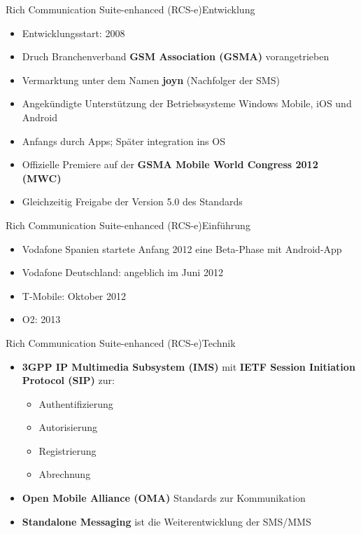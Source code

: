 \documentclass{beamer}
\begin{document}
\begin{frame}{Rich Communication Suite-enhanced (RCS-e)}{Entwicklung}
	\begin{itemize}
		\item Entwicklungsstart: 2008
		\item Druch Branchenverband \textbf{GSM Association (GSMA)} vorangetrieben
		\item Vermarktung unter dem Namen \textbf{joyn} (\glqq{}Nachfolger der SMS\grqq{})
		\item Angekündigte Unterstützung der Betriebssysteme Windows Mobile, iOS und Android
		\item Anfangs durch Apps; Später integration ins OS
		\item Offizielle Premiere auf der \textbf{GSMA Mobile World Congress 2012 (MWC)}
		\item Gleichzeitig Freigabe der Version 5.0 des Standards
	\end{itemize}
\end{frame}

\begin{frame}{Rich Communication Suite-enhanced (RCS-e)}{Einführung}
\begin{itemize}
	\item Vodafone Spanien startete Anfang 2012 eine Beta-Phase mit Android-App
	\item Vodafone Deutschland: \glqq{}angeblich\grqq{} im Juni 2012
	\item T-Mobile: Oktober 2012
	\item O2: 2013
\end{itemize}
\end{frame}


\begin{frame}{Rich Communication Suite-enhanced (RCS-e)}{Technik\cite{rcs:spec}}
	\begin{itemize}
		\item \textbf{3GPP IP Multimedia Subsystem (IMS)} mit \textbf{IETF Session Initiation Protocol (SIP)} zur:
			\begin{itemize}
				\item Authentifizierung
				\item Autorisierung
				\item Registrierung
				\item Abrechnung
			\end{itemize}
		\item \textbf{Open Mobile Alliance (OMA)} Standards zur Kommunikation
		\item \textbf{Standalone Messaging} ist die Weiterentwicklung der SMS/MMS
	\end{itemize}
\end{frame}
\end{document}
